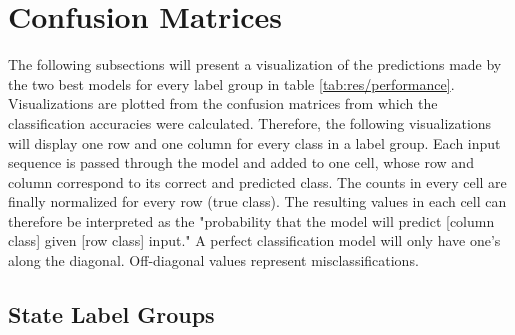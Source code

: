 \section{Confusion Matrices} \label{sec:res/confusion}

The following subsections will present a visualization of the predictions made by the two best models for every label group in table \ref{tab:res/performance}. Visualizations are plotted from the confusion matrices from which the classification accuracies were calculated. Therefore, the following visualizations will display one row and one column for every class in a label group. Each input sequence is passed through the model and added to one cell, whose row and column correspond to its correct and predicted class. The counts in every cell are finally normalized for every row (true class). The resulting values in each cell can therefore be interpreted as the "probability that the model will predict [column class] given [row class] input." A perfect classification model will only have one's along the diagonal. Off-diagonal values represent misclassifications.

\newpage
\subsection{State Label Groups}

